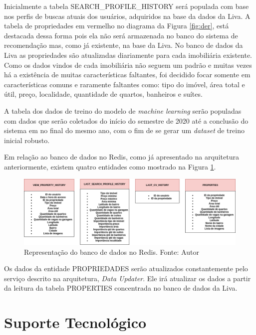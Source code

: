 Inicialmente a tabela SEARCH\_PROFILE\_HISTORY será populada com base nos perfis de buscas atuais dos usuários, adquiridos na base da dados da Liva. A tabela de propriedades em vermelho no diagrama da Figura \ref{fig:der}, está destacada dessa forma pois ela não será armazenada no banco do sistema de recomendação mas, como já existente, na base da Liva. No banco de dados da Liva as propriedades são atualizadas diariamente para cada imobiliária existente. Como os dados vindos de cada imobiliária não seguem um padrão e muitas vezes há a existência de muitas características faltantes, foi decidido focar somente em características comuns e raramente faltantes como: tipo do imóvel, área total e útil, preço, localidade, quantidade de quartos, banheiros e suítes.

A tabela dos dados de treino do modelo de \textit{machine learning} serão populadas com dados que serão coletados do início do semestre de 2020 até a conclusão do sistema em no final do mesmo ano, com o fim de se gerar um \textit{dataset} de treino inicial robusto.

Em relação ao banco de dados no Redis, como já apresentado na arquitetura anteriormente, existem quatro entidades como mostrado na Figura \ref{fig:redis}.

\begin{figure}[H]
    \centering
    \includegraphics[scale=0.4]{figuras/proposta/redis.png}
    \caption[Representação do banco de dados no Redis]{Representação do banco de dados no Redis. Fonte: Autor}
    \label{fig:redis}
\end{figure}

Os dados da entidade PROPRIEDADES serão atualizados constantemente pelo serviço descrito na arquitetura, \textit{Data Updater}. Ele irá atualizar os dados a partir da leitura da tabela PROPERTIES concentrada no banco de dados da Liva.

\section{Suporte Tecnológico}

